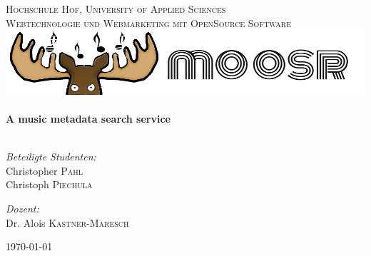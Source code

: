 

\begin{titlepage}
\begin{center}

\textsc{\LARGE  Hochschule Hof, University of Applied Sciences}\\[1.5cm]
\textsc{\Large Webtechnologie und Webmarketing mit OpenSource Software}\\[0.5cm]


\includegraphics[scale=0.4]{./gfx/elchlogo}\\[1cm]    
\HRule \\[0.4cm]
{ \huge \bfseries A music metadata search service}\\[0.4cm]

\HRule \\[1.5cm]

\begin{minipage}{0.4\textwidth}
\begin{flushleft} \large
\emph{Beteiligte Studenten:}\\
Christopher \textsc{Pahl}\\
Christoph \textsc{Piechula}
\end{flushleft}
\end{minipage}
\begin{minipage}{0.4\textwidth}
\begin{flushright} \large
\emph{Dozent:} \\
Dr. Alois \textsc{Kastner-Maresch}
\end{flushright}
\end{minipage}

\vfill

{\large \today}

\end{center}

\end{titlepage}
